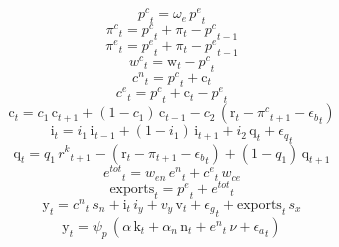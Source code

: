 \begin{dmath}
{{p^{c}}}_{t}={{\omega_{e}}}\, {{p^{e}}}_{t}
\end{dmath}
\begin{dmath}
{{\pi^{c}}}_{t}={{p^{c}}}_{t}+{{\pi}}_{t}-{{p^{c}}}_{t-1}
\end{dmath}
\begin{dmath}
{{\pi^{e}}}_{t}={{p^{e}}}_{t}+{{\pi}}_{t}-{{p^{e}}}_{t-1}
\end{dmath}
\begin{dmath}
{{w^{c}}}_{t}={{\mathrm{w}}}_{t}-{{p^{c}}}_{t}
\end{dmath}
\begin{dmath}
{{c^{n}}}_{t}={{p^{c}}}_{t}+{{\mathrm{c}}}_{t}
\end{dmath}
\begin{dmath}
{{c^{e}}}_{t}={{p^{c}}}_{t}+{{\mathrm{c}}}_{t}-{{p^{e}}}_{t}
\end{dmath}
\begin{dmath}
{{\mathrm{c}}}_{t}={{c_{1}}}\, {{\mathrm{c}}}_{t+1}+\left(1-{{c_{1}}}\right)\, {{\mathrm{c}}}_{t-1}-{{c_{2}}}\, \left({{\mathrm{r}}}_{t}-{{\pi^{c}}}_{t+1}-{{\epsilon_{b}}}_{t}\right)
\end{dmath}
\begin{dmath}
{{\mathrm{i}}}_{t}={{i_{1}}}\, {{\mathrm{i}}}_{t-1}+\left(1-{{i_{1}}}\right)\, {{\mathrm{i}}}_{t+1}+{{i_{2}}}\, {{\mathrm{q}}}_{t}+{{\epsilon_{q}}}_{t}
\end{dmath}
\begin{dmath}
{{\mathrm{q}}}_{t}={{q_{1}}}\, {{r^{k}}}_{t+1}-\left({{\mathrm{r}}}_{t}-{{\pi}}_{t+1}-{{\epsilon_{b}}}_{t}\right)+\left(1-{{q_{1}}}\right)\, {{\mathrm{q}}}_{t+1}
\end{dmath}
\begin{dmath}
{{e^{tot}}}_{t}={{w_{en}}}\, {{e^{n}}}_{t}+{{c^{e}}}_{t}\, {{w_{ce}}}
\end{dmath}
\begin{dmath}
{{\mathrm{exports}}}_{t}={{p^{e}}}_{t}+{{e^{tot}}}_{t}
\end{dmath}
\begin{dmath}
{{\mathrm{y}}}_{t}={{c^{n}}}_{t}\, {{s_{n}}}+{{\mathrm{i}}}_{t}\, {{i_{y}}}+{{v_{y}}}\, {{\mathrm{v}}}_{t}+{{\epsilon_{g}}}_{t}+{{\mathrm{exports}}}_{t}\, {{s_{x}}}
\end{dmath}
\begin{dmath}
{{\mathrm{y}}}_{t}={{\psi_{p}}}\, \left({{\alpha}}\, {{\mathrm{k}}}_{t}+{{\alpha_{n}}}\, {{\mathrm{n}}}_{t}+{{e^{n}}}_{t}\, {{\nu}}+{{\epsilon_{a}}}_{t}\right)
\end{dmath}
